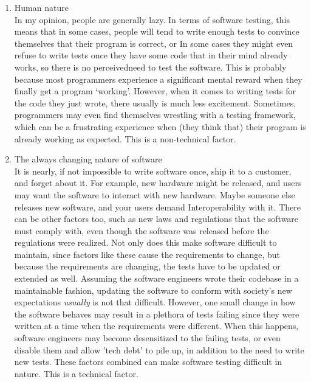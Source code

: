 \documentclass[letterpaper]{article}
\begin{document}
\begin{enumerate}
	\item Human nature\\
	      In my opinion, people are generally lazy. In terms of software testing, this means that in some cases,
	      people will tend to write enough tests to convince themselves that their program is correct, or
	      In some cases they might even refuse to write tests once they have some code that in their mind already works,
	      so there is no perceivedneed to test the software.
	      This is probably because most programmers experience a significant mental reward when they finally get a program `working'.
	      However, when it comes to writing tests for the code they just wrote, there usually is much less excitement.
	      Sometimes, programmers may even find themselves wrestling with a testing framework, which can be a frustrating experience when (they think that)
	      their program is already working as expected. This is a non-technical factor.

	\item The always changing nature of software\\
	      It is nearly, if not impossible to write software once, ship it to a customer, and forget about it.
	      For example, new hardware might be released, and users may want the software to interact with new hardware.
	      Maybe someone else releases new software, and your users demand Interoperability with it.
	      There can be other factors too, such as new laws and regulations that the software must comply with,
	      even though the software was released before the regulations were realized. Not only does this make
	      software difficult to maintain, since factors like these cause the requirements to change, but because the
	      requirements are changing, the tests have to be updated or extended as well.
	      Assuming the software engineers wrote their codebase in a maintainable fashion, updating the software
	      to conform with society's new expectations \textit{usually} is not that difficult. However, one small change
	      in how the software behaves may result in a plethora of tests failing since they were written at a time
	      when the requirements were different.
	      When this happens, software engineers may become desensitized to the failing tests, or even disable them
	      and allow 'tech debt' to pile up, in addition to the need to write new tests. These factors combined can make
	      software testing difficult in nature. This is a technical factor.
\end{enumerate}
\end{document}
